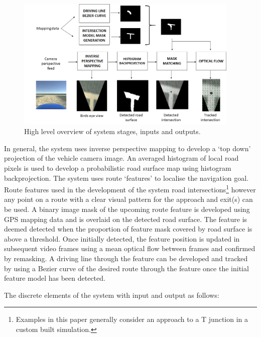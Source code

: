 \documentclass[]{aiaa-tc}%
\begin{document}
\begin{figure}
	\centering
	\includegraphics[width=0.95\textwidth]{systemOverview.png}
	\caption{High level overview of system stages, inputs and outputs.}
	\label{f:systemOverview}
\end{figure}


In general, the system uses inverse perspective mapping to develop a `top down' projection of the vehicle camera image. An averaged histogram of local road pixels is used to develop a probabilistic road surface map using histogram backprojection. The system uses route `features' to localise the navigation goal. Route features used in the development of the system road intersections\footnote{Examples in this paper generally consider an approach to a T junction in a custom built simulation.} however any point on a route with a clear visual pattern for the approach and exit(s) can be used. A binary image mask of the upcoming route feature is developed using GPS mapping data and is overlaid on the detected road surface. The feature is deemed detected when the proportion of feature mask covered by road surface is above a threshold. Once initially detected, the feature position is updated in subsequent video frames using a mean optical flow between frames and confirmed by remasking. A driving line through the feature can be developed and tracked by using a Bezier curve of the desired route through the feature once the initial feature model has been detected.

The discrete elements of the system with input and output as follows: 
\end{document}
